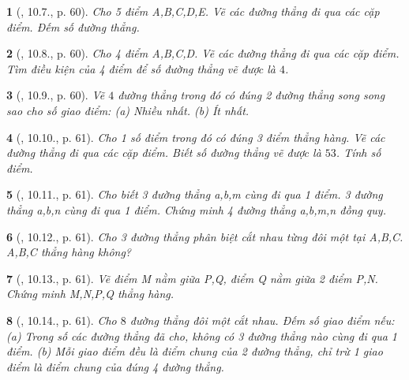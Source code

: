 \documentclass{article}
\newtheorem{baitoan}{}
\begin{document}
\begin{baitoan}[\cite{Binh_boi_duong_Toan_6_tap_2}, 10.7., p. 60]
	Cho 5 điểm A,B,C,D,E. Vẽ các đường thẳng đi qua các cặp điểm. Đếm số đường thẳng.
\end{baitoan}

\begin{baitoan}[\cite{Binh_boi_duong_Toan_6_tap_2}, 10.8., p. 60]
	Cho 4 điểm A,B,C,D. Vẽ các đường thẳng đi qua các cặp điểm. Tìm điều kiện của 4 điểm để số đường thẳng vẽ được là $4$.
\end{baitoan}

\begin{baitoan}[\cite{Binh_boi_duong_Toan_6_tap_2}, 10.9., p. 60]
	Vẽ $4$ đường thẳng trong đó có đúng 2 đường thẳng song song sao cho số giao điểm: (a) Nhiều nhất. (b) Ít nhất.
\end{baitoan}

\begin{baitoan}[\cite{Binh_boi_duong_Toan_6_tap_2}, 10.10., p. 61]
	Cho 1 số điểm trong đó có đúng 3 điểm thẳng hàng. Vẽ các đường thẳng đi qua các cặp điểm. Biết số đường thẳng vẽ được là $53$. Tính số điểm.
\end{baitoan}

\begin{baitoan}[\cite{Binh_boi_duong_Toan_6_tap_2}, 10.11., p. 61]
	Cho biết 3 đường thẳng a,b,m cùng đi qua 1 điểm. 3 đường thẳng a,b,n cùng đi qua 1 điểm. Chứng minh 4 đường thẳng a,b,m,n đồng quy.
\end{baitoan}

\begin{baitoan}[\cite{Binh_boi_duong_Toan_6_tap_2}, 10.12., p. 61]
	Cho 3 đường thẳng phân biệt cắt nhau từng đôi một tại A,B,C. A,B,C thẳng hàng không?
\end{baitoan}

\begin{baitoan}[\cite{Binh_boi_duong_Toan_6_tap_2}, 10.13., p. 61]
	Vẽ điểm M nằm giữa P,Q, điểm Q nằm giữa 2 điểm P,N. Chứng minh M,N,P,Q thẳng hàng.
\end{baitoan}

\begin{baitoan}[\cite{Binh_boi_duong_Toan_6_tap_2}, 10.14., p. 61]
	Cho $8$ đường thẳng đôi một cắt nhau. Đếm số giao điểm nếu: (a) Trong số các đường thẳng đã cho, không có 3 đường thẳng nào cùng đi qua 1 điểm. (b) Mỗi giao điểm đều là điểm chung của 2 đường thẳng, chỉ trừ 1 giao điểm là điểm chung của đúng 4 đường thẳng.
\end{baitoan}
\end{document}
